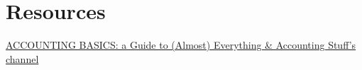 \documentclass{article}
\begin{document}



\newpage
\hypertarget{toc}{}
\tableofcontents
\newpage










\section{Resources}
\href{https://youtu.be/yYX4bvQSqbo?si=JNw8xPh7I50bIBxX}{ACCOUNTING BASICS: a Guide to (Almost) Everything \& Accounting Stuff's channel}
\end{document}
